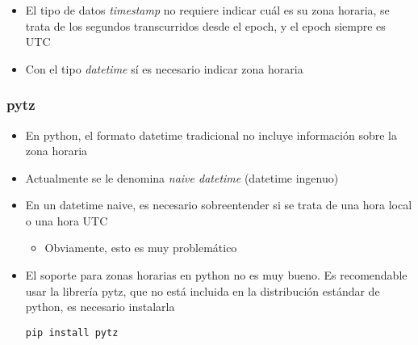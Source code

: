 \documentclass[ucs]{beamer}
\begin{document}
\begin{frame}[fragile]
\frametitle{}
\begin{itemize}
\item
El tipo de datos 
\emph{timestamp}
no requiere indicar cuál es su zona horaria, se trata de los segundos
transcurridos desde el epoch, y el epoch siempre es UTC

\item
Con el tipo \emph{datetime} sí es necesario indicar zona horaria

\end{itemize}

\end{frame}





\begin{frame}[fragile]
\frametitle{pytz}
\begin{itemize}
\item
En python, el formato datetime tradicional no incluye información sobre
la zona horaria
\item
Actualmente se le denomina
\emph{naive datetime} (datetime ingenuo)
\item
En un datetime naive, es necesario sobreentender si se trata de una hora local
o una hora UTC

\begin{itemize}
\item
Obviamente, esto es muy problemático
\end{itemize}

\item
El soporte para zonas horarias en python no es muy bueno. Es recomendable usar
la librería pytz, que no está incluida en la distribución estándar de python,
es necesario instalarla

\verb|pip install pytz|

\end{itemize}
\end{frame}
\end{document}
